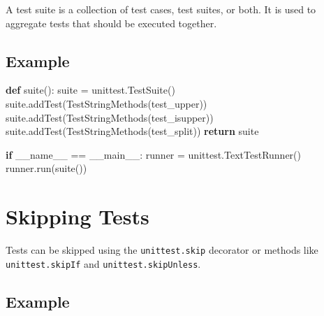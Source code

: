 \documentclass[
  letterpaper,
  DIV=11,
  numbers=noendperiod]{scrreprt}
\newenvironment{Shaded}{\begin{snugshade}}{\end{snugshade}}
\newcommand{\ControlFlowTok}[1]{\textcolor[rgb]{0.00,0.23,0.31}{\textbf{#1}}}
\newcommand{\KeywordTok}[1]{\textcolor[rgb]{0.00,0.23,0.31}{\textbf{#1}}}
\newcommand{\NormalTok}[1]{\textcolor[rgb]{0.00,0.23,0.31}{#1}}
\newcommand{\OperatorTok}[1]{\textcolor[rgb]{0.37,0.37,0.37}{#1}}
\newcommand{\StringTok}[1]{\textcolor[rgb]{0.13,0.47,0.30}{#1}}
\newcommand{\VariableTok}[1]{\textcolor[rgb]{0.07,0.07,0.07}{#1}}
\begin{document}
A test suite is a collection of test cases, test suites, or both. It is
used to aggregate tests that should be executed together.

\subsection{Example}\label{example-13}

\begin{Shaded}
\begin{Highlighting}[]
\KeywordTok{def}\NormalTok{ suite():}
\NormalTok{    suite }\OperatorTok{=}\NormalTok{ unittest.TestSuite()}
\NormalTok{    suite.addTest(TestStringMethods(}\StringTok{\textquotesingle{}test\_upper\textquotesingle{}}\NormalTok{))}
\NormalTok{    suite.addTest(TestStringMethods(}\StringTok{\textquotesingle{}test\_isupper\textquotesingle{}}\NormalTok{))}
\NormalTok{    suite.addTest(TestStringMethods(}\StringTok{\textquotesingle{}test\_split\textquotesingle{}}\NormalTok{))}
    \ControlFlowTok{return}\NormalTok{ suite}

\ControlFlowTok{if} \VariableTok{\_\_name\_\_} \OperatorTok{==} \StringTok{\textquotesingle{}\_\_main\_\_\textquotesingle{}}\NormalTok{:}
\NormalTok{    runner }\OperatorTok{=}\NormalTok{ unittest.TextTestRunner()}
\NormalTok{    runner.run(suite())}
\end{Highlighting}
\end{Shaded}

\section{Skipping Tests}\label{skipping-tests}

Tests can be skipped using the \texttt{unittest.skip} decorator or
methods like \texttt{unittest.skipIf} and \texttt{unittest.skipUnless}.

\subsection{Example}\label{example-14}
\end{document}
